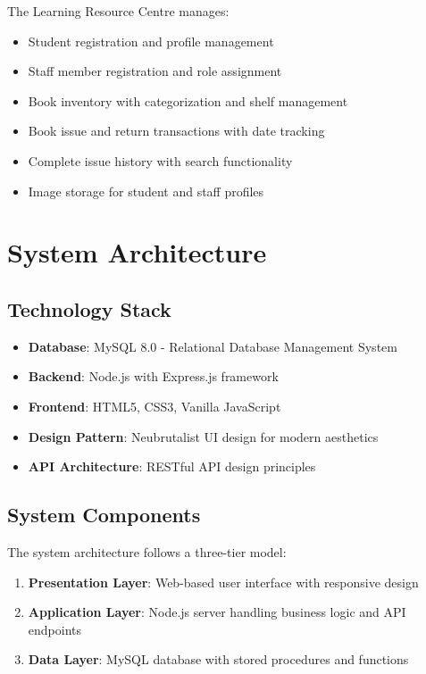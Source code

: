 \documentclass[12pt,a4paper]{article}
\newenvironment{techbox}[1]
{%
  \begin{tcolorbox}[
    colback=jiitblue!5,
    colframe=jiitblue,
    title={\faDatabase\ #1},
    fonttitle=\bfseries,
    left=10pt,
    right=10pt,
    breakable
  ]
}{%
  \end{tcolorbox}
}
\begin{document}
The Learning Resource Centre manages:
\begin{itemize}
    \item Student registration and profile management
    \item Staff member registration and role assignment
    \item Book inventory with categorization and shelf management
    \item Book issue and return transactions with date tracking
    \item Complete issue history with search functionality
    \item Image storage for student and staff profiles
\end{itemize}

\section{System Architecture}

\subsection{Technology Stack}

\begin{techbox}{Technology Components}
\begin{itemize}
    \item \textbf{Database}: MySQL 8.0 - Relational Database Management System
    \item \textbf{Backend}: Node.js with Express.js framework
    \item \textbf{Frontend}: HTML5, CSS3, Vanilla JavaScript
    \item \textbf{Design Pattern}: Neubrutalist UI design for modern aesthetics
    \item \textbf{API Architecture}: RESTful API design principles
\end{itemize}
\end{techbox}

\subsection{System Components}

The system architecture follows a three-tier model:

\begin{enumerate}
    \item \textbf{Presentation Layer}: Web-based user interface with responsive design
    \item \textbf{Application Layer}: Node.js server handling business logic and API endpoints
    \item \textbf{Data Layer}: MySQL database with stored procedures and functions
\end{enumerate}
\end{document}
